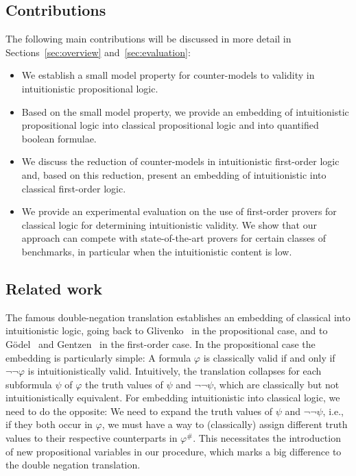 \documentclass{easychair}
\theoremstyle{definition}
\theoremstyle{definition}
\theoremstyle{definition}
\theoremstyle{definition}
\theoremstyle{definition}
\theoremstyle{definition}
\theoremstyle{definition}
\begin{document}
\subsection*{Contributions}
The following main contributions will be discussed in more detail in Sections~\ref{sec:overview} and~\ref{sec:evaluation}:
\begin{itemize}
	\item We establish a small model property for counter-models to validity in intuitionistic propositional logic.
	\item Based on the small model property, we provide an embedding of intuitionistic propositional logic into classical propositional logic and into quantified boolean formulae.
	\item We discuss the reduction of counter-models in intuitionistic first-order logic and, based on this reduction, present an embedding of intuitionistic into classical first-order logic.
	\item We provide an experimental evaluation on the use of first-order provers for classical logic for determining intuitionistic validity.
 We show that our approach can compete with state-of-the-art provers for certain classes of benchmarks, in particular when the intuitionistic content is low.
\end{itemize}

\subsection*{Related work}
The famous double-negation translation establishes
an embedding of classical into intuitionistic logic, going back to Glivenko~\cite{glivenko1929quelques} in the propositional case, and to G\"odel~\cite{godel1933intuitionistischen} and Gentzen~\cite{gentzen1936widerspruchsfreiheit} in the first-order case.
In the propositional case the embedding is particularly simple:
A formula $\varphi$ is classically valid if and only if $\neg\neg\varphi$ is intuitionistically valid.
Intuitively, the translation collapses for each subformula $\psi$ of $\varphi$ the truth values of $\psi$ and $\neg\neg\psi$, which are classically but not intuitionistically equivalent.
For embedding intuitionistic into classical logic, we need to do the opposite:
We need to expand the truth values of $\psi$ and $\neg\neg\psi$, i.e., if they both occur in $\varphi$, we must have a way to (classically) assign different truth values to their respective counterparts in $\varphi^\#$.
This necessitates the introduction of new propositional variables in our procedure, which marks a big difference to the double negation translation.
\end{document}
